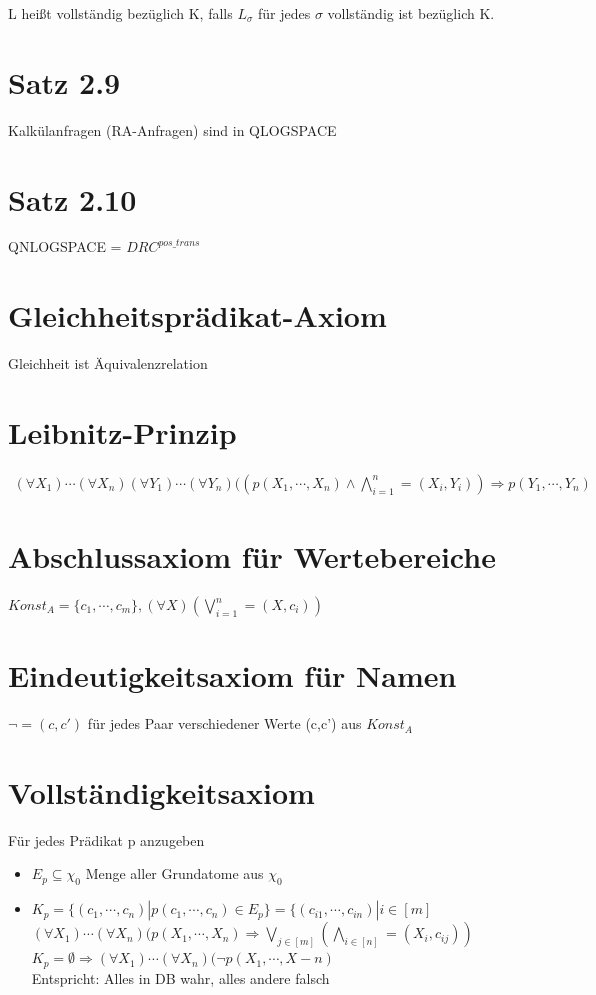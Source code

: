 \documentclass[12pt, a4paper]{article}
\begin{document}
L heißt vollständig bezüglich K, falls $L_\sigma$ für jedes $\sigma$ vollständig ist bezüglich K.

\section*{Satz 2.9}
Kalkülanfragen (RA-Anfragen) sind in QLOGSPACE

\section*{Satz 2.10}

QNLOGSPACE = $DRC^{pos\_trans}$


\newpage

\section*{Gleichheitsprädikat-Axiom}
Gleichheit ist Äquivalenzrelation

\section*{Leibnitz-Prinzip}
\begin{align*}
(\forall X_1)\cdots(\forall X_n)(\forall Y_1)\cdots(\forall Y_n)((p(X_1, \cdots, X_n) \wedge \bigwedge^n_{i=1} =(X_i, Y_i)) \Rightarrow p(Y_1,  \cdots, Y_n)
\end{align*}

\section*{Abschlussaxiom für Wertebereiche}
$Konst_A = \{c_1, \cdots, c_m\}, (\forall X)(\bigvee^n_{i=1} =(X, c_i))$

\section*{Eindeutigkeitsaxiom für Namen}
$\lnot = (c,c')$ für jedes Paar verschiedener Werte (c,c') aus $Konst_A$

\section*{Vollständigkeitsaxiom}
Für jedes Prädikat p anzugeben \\
\begin{itemize}
\item $E_p \subseteq \chi_0$ Menge aller Grundatome aus $\chi_0$
\item $K_p = \{(c_1, \cdots, c_n) | p(c_1, \cdots, c_n) \in E_p \} = \{(c_{i1}, \cdots, c_{in}) | i \in [m]$ \\
$(\forall X_1)\cdots(\forall X_n)(p(X_1, \cdots, X_n) \Rightarrow \bigvee_{j \in [m]}(\bigwedge_{i \in [n]} =(X_i, c_{ij})) $ \\
$K_p = \emptyset \Rightarrow (\forall X_1)\cdots(\forall X_n)(\lnot p(X_1, \cdots, X-n)$ \\
Entspricht: Alles in DB wahr, alles andere falsch
\end{itemize}
\end{document}
